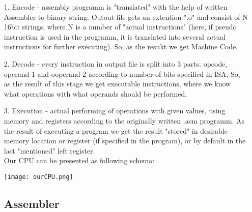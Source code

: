 \documentclass[11pt,twoside,a4paper]{article}
\begin{document}
\begin{enumerate}
	\item[1.] Encode - assembly programm is "translated" with the help of written Assembler to binary string. Outout file gets an extention ".o" and consist of N 16bit strings, where N is a number of "actual instructions" (here, if pseudo instruction is used in the programm, it is translated into several actual instructions for further executing). So, as the resukt we get Machine Code.
	\item[2.] Decode - every instruction in output file is split into 3 parts: opcode, operand 1 and ooperand 2 according to number of bits specified in ISA. So, as the result of this stage we get executable instructions, where we know what operations with what operands should be performed. 
	\item[3.] Execution - actual performing of operations with given values, using memory and registers according to the originally written .asm programm. As the result of executing a program we get the result "stored" in desirable memory location or register (if specified in the program), or by default in the last "mentioned" left register.\\
Our CPU can be presented as following schema:
\begin{center}
\texttt{[image: ourCPU.png]}
\end{center}

\newpage
\subsection{Assembler}
	
\end{enumerate} 
\end{document}
